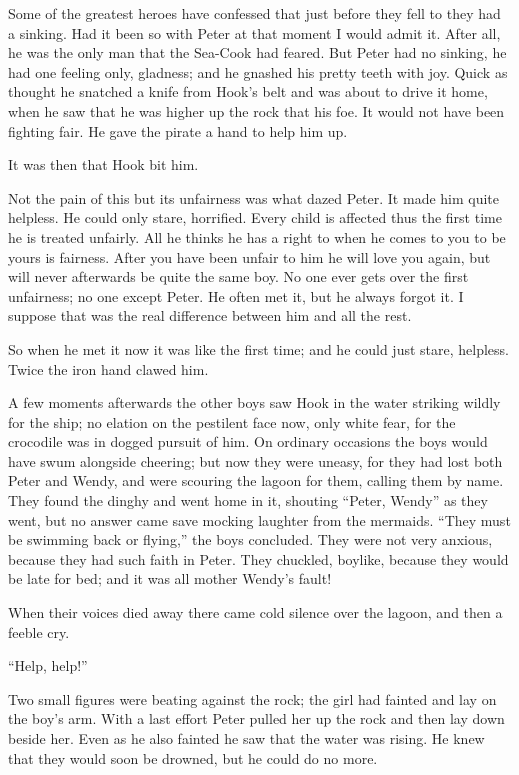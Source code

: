 Some of the greatest heroes have confessed that just before they fell to they had a sinking.
Had it been so with Peter at that moment I would admit it.
After all, he was the only man that the Sea-Cook had feared.
But Peter had no sinking, he had one feeling only, gladness;
and he gnashed his pretty teeth with joy.
Quick as thought he snatched a knife from Hook’s belt and was about to drive it home,
when he saw that he was higher up the rock that his foe.
It would not have been fighting fair.
He gave the pirate a hand to help him up.

It was then that Hook bit him.

Not the pain of this but its unfairness was what dazed Peter.
It made him quite helpless.
He could only stare, horrified.
Every child is affected thus the first time he is treated unfairly.
All he thinks he has a right to when he comes to you to be yours is fairness.
After you have been unfair to him he will love you again,
but will never afterwards be quite the same boy.
No one ever gets over the first unfairness;
no one except Peter.
He often met it, but he always forgot it.
I suppose that was the real difference between him and all the rest.

So when he met it now it was like the first time;
and he could just stare, helpless.
Twice the iron hand clawed him.

A few moments afterwards the other boys saw Hook in the water striking wildly for the ship;
no elation on the pestilent face now, only white fear,
for the crocodile was in dogged pursuit of him.
On ordinary occasions the boys would have swum alongside cheering;
but now they were uneasy, for they had lost both Peter and Wendy,
and were scouring the lagoon for them, calling them by name.
They found the dinghy and went home in it, shouting “Peter, Wendy” as they went,
but no answer came save mocking laughter from the mermaids.
“They must be swimming back or flying,” the boys concluded.
They were not very anxious, because they had such faith in Peter.
They chuckled, boylike, because they would be late for bed;
and it was all mother Wendy’s fault!

When their voices died away there came cold silence over the lagoon, and then a feeble cry.

“Help, help!”

Two small figures were beating against the rock;
the girl had fainted and lay on the boy’s arm.
With a last effort Peter pulled her up the rock and then lay down beside her.
Even as he also fainted he saw that the water was rising.
He knew that they would soon be drowned, but he could do no more.

